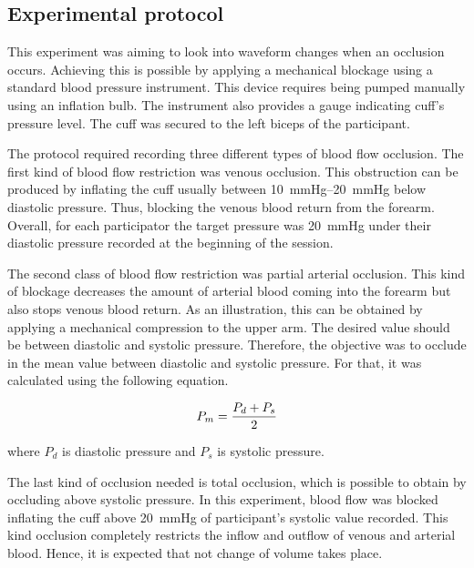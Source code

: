 
\subsection{Experimental protocol}
\label{section4.1.3}

This experiment was aiming to look into waveform changes when an occlusion occurs. Achieving this is possible by applying a mechanical blockage using a standard blood pressure instrument. This device requires being pumped manually using an inflation bulb. The instrument also provides a gauge indicating cuff's pressure level. The cuff was secured to the left biceps of the participant. 

The protocol required recording three different types of blood flow occlusion. The first kind of blood flow restriction was venous occlusion.  This obstruction can be produced by inflating the cuff usually between \SIrange{10}{20}{\mmHg} below diastolic pressure. Thus, blocking the venous blood return from the forearm.  Overall, for each participator the target pressure was \SI{20}{\mmHg} under their diastolic pressure recorded at the beginning of the session. 

The second class of blood flow restriction was partial arterial occlusion. This kind of blockage decreases the amount of arterial blood coming into the forearm but also stops venous blood return. As an illustration, this can be obtained by applying a mechanical compression to the upper arm. The desired value should be between diastolic and systolic pressure. Therefore, the objective was to occlude in the mean value between diastolic and systolic pressure. For that, it was calculated using the following equation.


\begin{align}
	\label{eq:meanpressure}
	P_m = \frac{P_d + P_s}{2} \tagaddtext{[\si{\mmHg}]}
\end{align}

where $P_d$ is diastolic pressure and $P_s$ is systolic pressure. 

The last kind of occlusion needed is total occlusion, which is possible to obtain by occluding above systolic pressure. In this experiment, blood flow was blocked inflating the cuff above \SI{20}{\mmHg} of participant's systolic value recorded. This kind occlusion completely restricts the inflow and outflow of venous and arterial blood. Hence, it is expected that not change of volume takes place.


